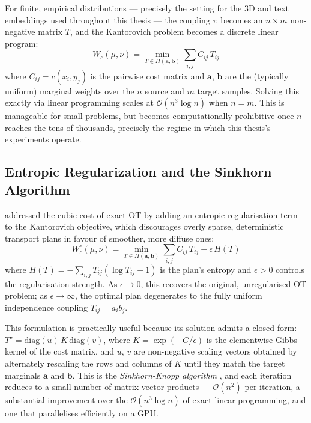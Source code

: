 For finite, empirical distributions --- precisely the setting for the 3D and text embeddings used throughout this thesis --- the coupling $\pi$ becomes an $n \times m$ non-negative matrix $T$, and the Kantorovich problem becomes a discrete linear program:
\begin{equation}
    W_c(\mu, \nu) = \min_{T \in \Pi(\mathbf{a}, \mathbf{b})} \sum_{i,j} C_{ij} \, T_{ij}
    \label{eq:discrete_ot}
\end{equation}
where $C_{ij} = c(x_i, y_j)$ is the pairwise cost matrix and $\mathbf{a}$, $\mathbf{b}$ are the (typically uniform) marginal weights over the $n$ source and $m$ target samples. Solving this exactly via linear programming scales at $\mathcal{O}(n^3 \log n)$ when $n=m$. This is manageable for small problems, but becomes computationally prohibitive once $n$ reaches the tens of thousands, precisely the regime in which this thesis's experiments operate.

\subsection{Entropic Regularization and the Sinkhorn Algorithm}
\label{subsec:sinkhorn}

\textcite{cuturi2013sinkhorn} addressed the cubic cost of exact OT by adding an entropic regularisation term to the Kantorovich objective, which discourages overly sparse, deterministic transport plans in favour of smoother, more diffuse ones:
\begin{equation}
    W_c^\epsilon(\mu, \nu) = \min_{T \in \Pi(\mathbf{a}, \mathbf{b})} \sum_{i,j} C_{ij} \, T_{ij} - \epsilon \, H(T)
    \label{eq:entropic_ot}
\end{equation}
where $H(T) = -\sum_{i,j} T_{ij} (\log T_{ij} - 1)$ is the plan's entropy and $\epsilon > 0$ controls the regularisation strength. As $\epsilon \to 0$, this recovers the original, unregularised OT problem; as $\epsilon \to \infty$, the optimal plan degenerates to the fully uniform independence coupling $T_{ij} = a_i b_j$.

This formulation is practically useful because its solution admits a closed form: $T^\star = \mathrm{diag}(u) \, K \, \mathrm{diag}(v)$, where $K = \exp(-C/\epsilon)$ is the elementwise Gibbs kernel of the cost matrix, and $u$, $v$ are non-negative scaling vectors obtained by alternately rescaling the rows and columns of $K$ until they match the target marginals $\mathbf{a}$ and $\mathbf{b}$. This is the \emph{Sinkhorn-Knopp algorithm} \cite{cuturi2013sinkhorn}, and each iteration reduces to a small number of matrix-vector products --- $\mathcal{O}(n^2)$ per iteration, a substantial improvement over the $\mathcal{O}(n^3 \log n)$ of exact linear programming, and one that parallelises efficiently on a GPU.

